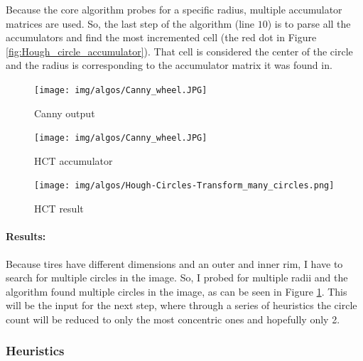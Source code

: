 Because the core algorithm probes for a specific radius, multiple accumulator matrices are used. So, the last step of the algorithm (line $10$) is to parse all the accumulators and find the most incremented cell (the red dot in Figure \ref{fig:Hough_circle_accumulator}). That cell is considered the center of the circle and the radius is corresponding to the accumulator matrix it was found in.

\begin{figure}
    \centering
    \begin{minipage}[c]{0.33\linewidth}
        \centering
        \texttt{[image: img/algos/Canny\_wheel.JPG]}
            \caption{Canny output}
            \label{fig:canny_output_tire}
    \end{minipage}\hfill
    \begin{minipage}[c]{0.33\linewidth}
        \centering
        \texttt{[image: img/algos/Canny\_wheel.JPG]}
            \caption{HCT accumulator}
            \label{fig:Hough_circle_accumulator}
    \end{minipage}
    \begin{minipage}[c]{0.33\linewidth}
        \centering
        \texttt{[image: img/algos/Hough-Circles-Transform\_many\_circles.png]}
        \caption{HCT result}
        \label{fig:Hough-Circles-Transform_result}
    \end{minipage}
\end{figure}

\paragraph*{Results:}\mbox{}\par
Because tires have different dimensions and an outer and inner rim, I have to search for multiple circles in the image. So, I probed for multiple radii and the algorithm found multiple circles in the image, as can be seen in Figure \ref{fig:Hough-Circles-Transform_result}. This will be the input for the next step, where through a series of heuristics the circle count will be reduced to only the most concentric ones and hopefully only 2.


\subsubsection{Heuristics}
\label{subsubsec:circ_det_heuristics}

